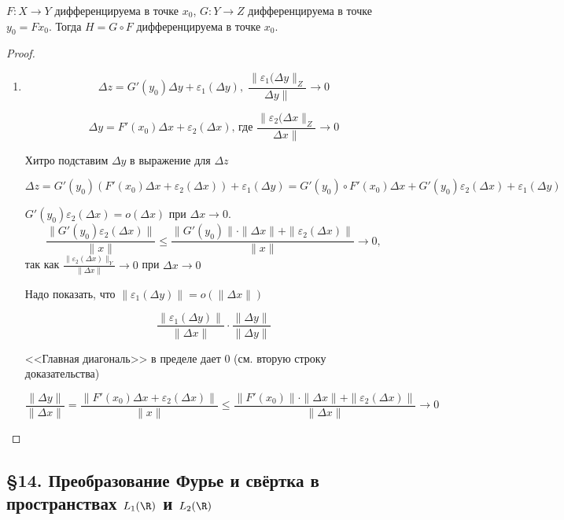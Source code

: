 \begin{statement}
    $F: X \to Y$ дифференцируема в точке $x_0$, $G: Y \to Z$ дифференцируема в точке $y_0 = F x_0$. Тогда $H = G \circ F$ дифференцируема в точке $x_0$.
\end{statement}
\begin{proof}
    \begin{enumerate}
        \item \[ \Delta z = G'(y_0) \Delta y + \varepsilon_1(\Delta y), \; \frac{\|\varepsilon_1(\Delta y\|_Z}{\Delta y \|} \to 0 \]

        \[
        \Delta y = F'(x_0) \Delta x + \varepsilon_2(\Delta x) \text{, где } \frac{\|\varepsilon_2(\Delta x\|_Z}{\Delta x \|} \to 0
        \]

        Хитро подставим $\Delta y$ в выражение для $\Delta z$

        \[ 
        \Delta z = G'(y_0)(F'(x_0) \Delta x + \varepsilon_2(\Delta x)) + \varepsilon_1(\Delta y)=G'(y_0) \circ F'(x_0) \Delta x + G'(y_0) \varepsilon_2(\Delta x) + \varepsilon_1(\Delta y)
        \]

        $G'(y_0) \varepsilon_2(\Delta x) = o(\Delta x)$ при $\Delta x \to 0$.
        \[
        \frac{\|G'(y_0) \varepsilon_2(\Delta x)\|}{\|x\|}
        \leqslant \frac{\|G'(y_0)\| \cdot \|\Delta x\| + \|\varepsilon_2(\Delta x)\|}{\|x\|} \to 0,
        \]
        так как $\frac{\| \varepsilon_2(\Delta x) \|_Y}{\| \Delta x \|} \to 0$ при $\Delta x \to 0$
        
        Надо показать, что $\|\varepsilon_1(\Delta y)\| = o(\|\Delta x\|)$ 

        \[
        \frac{\|\varepsilon_1(\Delta y)\|}{\|\Delta x\|} \cdot \frac{\|\Delta y\|}{\|\Delta y\|}
        \]
        
        <<Главная диагональ>> в пределе дает 0 (см. вторую строку доказательства)
        
        \[
        \frac{\|\Delta y\|}{\|\Delta x\|} = 
        \frac{\|F'(x_0) \Delta x + \varepsilon_2(\Delta x)\|}{\|x\|} \leqslant 
        \frac{\|F'(x_0)\| \cdot \|\Delta x\| + \|\varepsilon_2(\Delta x)\|}{\|\Delta x\|} \to 0
        \]
        
    \end{enumerate}
\end{proof}

\subsection{§14. Преобразование Фурье и свёртка в пространствах $L_1(\R)$ и $L_2(\R)$}

